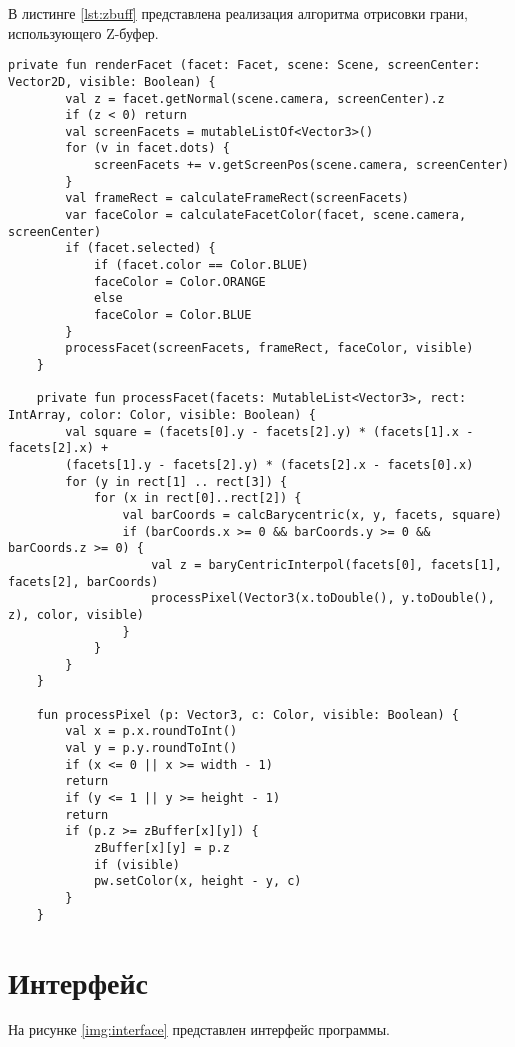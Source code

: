 В листинге \ref{lst:zbuff} представлена реализация алгоритма отрисовки грани, использующего Z-буфер.

\begin{lstlisting}[label=lst:zbuff,caption=Реализация алгоритма отрисовки грани\, использующего Z-буфер]
	private fun renderFacet (facet: Facet, scene: Scene, screenCenter: Vector2D, visible: Boolean) {
		val z = facet.getNormal(scene.camera, screenCenter).z
		if (z < 0) return
		val screenFacets = mutableListOf<Vector3>()
		for (v in facet.dots) {
			screenFacets += v.getScreenPos(scene.camera, screenCenter)
		}
		val frameRect = calculateFrameRect(screenFacets)
		var faceColor = calculateFacetColor(facet, scene.camera, screenCenter)
		if (facet.selected) {
			if (facet.color == Color.BLUE)
			faceColor = Color.ORANGE
			else
			faceColor = Color.BLUE
		}
		processFacet(screenFacets, frameRect, faceColor, visible)
	}

	private fun processFacet(facets: MutableList<Vector3>, rect: IntArray, color: Color, visible: Boolean) {
		val square = (facets[0].y - facets[2].y) * (facets[1].x - facets[2].x) +
		(facets[1].y - facets[2].y) * (facets[2].x - facets[0].x)
		for (y in rect[1] .. rect[3]) {
			for (x in rect[0]..rect[2]) {
				val barCoords = calcBarycentric(x, y, facets, square)
				if (barCoords.x >= 0 && barCoords.y >= 0 && barCoords.z >= 0) {
					val z = baryCentricInterpol(facets[0], facets[1], facets[2], barCoords)
					processPixel(Vector3(x.toDouble(), y.toDouble(), z), color, visible)
				}
			}
		}
	}

	fun processPixel (p: Vector3, c: Color, visible: Boolean) {
		val x = p.x.roundToInt()
		val y = p.y.roundToInt()
		if (x <= 0 || x >= width - 1)
		return
		if (y <= 1 || y >= height - 1)
		return
		if (p.z >= zBuffer[x][y]) {
			zBuffer[x][y] = p.z
			if (visible)
			pw.setColor(x, height - y, c)
		}
	}
\end{lstlisting}

\section{Интерфейс}

На рисунке \ref{img:interface} представлен интерфейс программы.


\FloatBarrier

